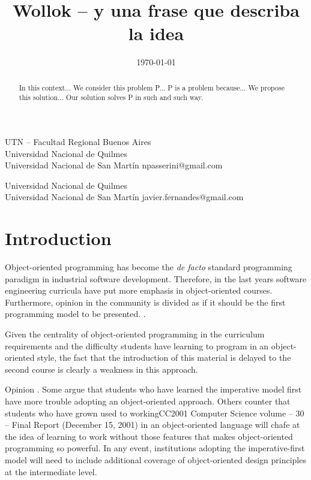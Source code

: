 \documentclass[preprint,10pt]{sigplanconf}
\begin{document}
\title{Wollok -- y una frase que describa la idea}
  {UTN -- Facultad Regional Buenos Aires \\ Universidad Nacional de Quilmes \\ Universidad Nacional de San Martín}
  {npasserini@gmail.com}
  
  {Universidad Nacional de Quilmes \\ Universidad Nacional de San Martín}
  {javier.fernandes@gmail.com}

\date{\today}
\maketitle

\begin{abstract}
In this context...
We consider this problem P...
P is a problem because...
We propose this solution...
Our solution solves P in such and such way.
\end{abstract}


\section{Introduction}
\label{sec:intro}


Object-oriented programming has become the \textit{de facto} standard programming paradigm in industrial software development.
Therefore, in the last years software engineering curricula have put more emphasis in object-oriented courses.
Furthermore, opinion in the community is divided as if it should be the first programming model to be presented. \cite{cooper_teaching_2003}.



Given the centrality of object-oriented programming in the
curriculum requirements and the difficulty students have learning to program in an
object-oriented style, the fact that the introduction of this material is delayed to the
second course is clearly a weakness in this approach. 

Opinion . Some argue
that students who have learned the imperative model first have more trouble adopting an
object-oriented approach. Others counter that students who have grown used to workingCC2001 Computer Science volume – 30 –
Final Report (December 15, 2001)
in an object-oriented language will chafe at the idea of learning to work without those
features that makes object-oriented programming so powerful.
In any event, institutions adopting the imperative-first model will need to include
additional coverage of object-oriented design principles at the intermediate level. 
\end{document}
